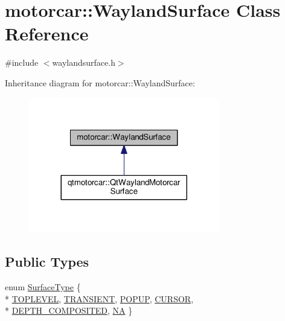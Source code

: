 \hypertarget{classmotorcar_1_1WaylandSurface}{\section{motorcar\-:\-:Wayland\-Surface Class Reference}
\label{classmotorcar_1_1WaylandSurface}
}


{\ttfamily \#include $<$waylandsurface.\-h$>$}



Inheritance diagram for motorcar\-:\-:Wayland\-Surface\-:
\nopagebreak
\begin{figure}[H]
\begin{center}
\leavevmode
\includegraphics[width=236pt]{classmotorcar_1_1WaylandSurface__inherit__graph}
\end{center}
\end{figure}
\subsection*{Public Types}
\begin{DoxyCompactItemize}
\item 
enum \hyperlink{classmotorcar_1_1WaylandSurface_a7715a41b6776800656722407ec01e0a5}{Surface\-Type} \{ \\*
\hyperlink{classmotorcar_1_1WaylandSurface_a7715a41b6776800656722407ec01e0a5adc40004cddf6c1404780c88ad509cede}{T\-O\-P\-L\-E\-V\-E\-L}, 
\hyperlink{classmotorcar_1_1WaylandSurface_a7715a41b6776800656722407ec01e0a5a5a1e368e9f069279fec128c5ebf04ee5}{T\-R\-A\-N\-S\-I\-E\-N\-T}, 
\hyperlink{classmotorcar_1_1WaylandSurface_a7715a41b6776800656722407ec01e0a5a91f194806c8b59a53b1ea5ee47d567dc}{P\-O\-P\-U\-P}, 
\hyperlink{classmotorcar_1_1WaylandSurface_a7715a41b6776800656722407ec01e0a5a23d1dd5df19bc211c5835e285ec08a46}{C\-U\-R\-S\-O\-R}, 
\\*
\hyperlink{classmotorcar_1_1WaylandSurface_a7715a41b6776800656722407ec01e0a5af7f2e96cc840c2259c93e4f9701b2038}{D\-E\-P\-T\-H\-\_\-\-C\-O\-M\-P\-O\-S\-I\-T\-E\-D}, 
\hyperlink{classmotorcar_1_1WaylandSurface_a7715a41b6776800656722407ec01e0a5a6577b08859e961558d1960bc03de1d51}{N\-A}
 \}
\end{DoxyCompactItemize}
